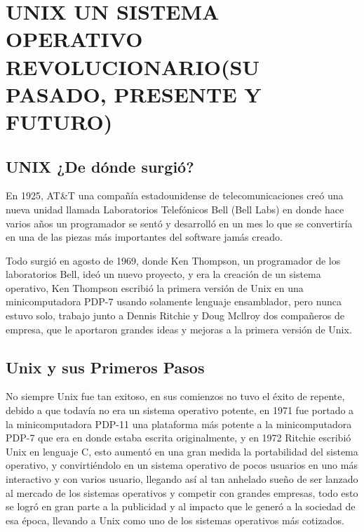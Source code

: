 \chapter*{UNIX UN SISTEMA OPERATIVO REVOLUCIONARIO(SU PASADO, PRESENTE Y FUTURO)}

\section*{UNIX ¿De dónde surgió?}
En 1925, AT&T  una compañía estadounidense de telecomunicaciones  creó una nueva unidad llamada Laboratorios Telefónicos Bell (Bell Labs) en donde hace  varios años  un             programador se sentó y  desarrolló   en un mes lo que se  convertiría  en una de las piezas más importantes del software jamás creado.

Todo surgió en agosto de 1969, donde Ken Thompson, un programador  de los laboratorios Bell, ideó  un nuevo proyecto, y era la creación de un sistema  operativo, Ken 
Thompson escribió la primera versión de Unix en una minicomputadora PDP-7 usando solamente lenguaje ensamblador, pero nunca  estuvo solo, trabajo junto a  Dennis Ritchie y 
Doug Mcllroy dos compañeros de empresa, que le aportaron  grandes ideas y mejoras  a la primera versión  de Unix.


\section*{Unix y sus Primeros Pasos}
No siempre Unix fue tan exitoso, en sus comienzos no tuvo el éxito de repente, debido a que todavía no era un sistema operativo potente, en 1971 fue portado a la 
minicomputadora PDP-11 una plataforma más potente a la minicomputadora PDP-7 que era en donde estaba escrita originalmente, y en 1972 Ritchie escribió Unix en lenguaje C, 
esto aumentó en una gran medida la portabilidad del sistema operativo, y convirtiéndolo en un sistema operativo de pocos usuarios en uno más interactivo y con varios 
usuario, llegando así al tan anhelado sueño de ser lanzado al mercado de los sistemas operativos y competir con grandes empresas, todo esto se logró en gran parte a la  
publicidad y al impacto que le generó a la sociedad de esa época, llevando a Unix como uno de los sistemas operativos más cotizados.


